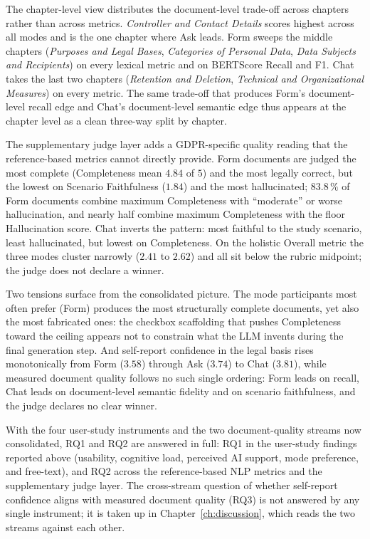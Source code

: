 The chapter-level view distributes the document-level trade-off
across chapters rather than across metrics. \emph{Controller and
Contact Details} scores highest across all modes and is the one
chapter where Ask leads. Form sweeps the middle chapters
(\emph{Purposes and Legal Bases}, \emph{Categories of Personal
Data}, \emph{Data Subjects and Recipients}) on every lexical
metric and on BERTScore Recall and F1. Chat takes the last two
chapters (\emph{Retention and Deletion}, \emph{Technical and
Organizational Measures}) on every metric. The same trade-off
that produces Form's document-level recall edge and Chat's
document-level semantic edge thus appears at the chapter level
as a clean three-way split by chapter.

The supplementary judge layer adds a GDPR-specific quality reading
that the reference-based metrics cannot directly provide. Form
documents are judged the most complete (Completeness mean $4.84$
of $5$) and the most legally correct, but the lowest on Scenario
Faithfulness ($1.84$) and the most hallucinated; $83.8\,\%$ of
Form documents combine maximum Completeness with ``moderate'' or
worse hallucination, and nearly half combine maximum Completeness
with the floor Hallucination score. Chat inverts the pattern:
most faithful to the study scenario, least hallucinated, but
lowest on Completeness. On the holistic Overall metric the three
modes cluster narrowly ($2.41$ to $2.62$) and all sit below the
rubric midpoint; the judge does not declare a winner.

Two tensions surface from the consolidated picture. The mode
participants most often prefer (Form) produces the most
structurally complete documents, yet also the most fabricated
ones: the checkbox scaffolding that pushes Completeness toward
the ceiling appears not to constrain what the LLM invents during
the final generation step. And self-report confidence in the
legal basis rises monotonically from Form ($3.58$) through Ask
($3.74$) to Chat ($3.81$), while measured document quality
follows no such single ordering: Form leads on recall, Chat leads
on document-level semantic fidelity and on scenario faithfulness,
and the judge declares no clear winner.

With the four user-study instruments and the two
document-quality streams now consolidated, RQ1 and RQ2 are
answered in full: RQ1 in the user-study findings reported above
(usability, cognitive load, perceived AI support, mode
preference, and free-text), and RQ2 across the reference-based
NLP metrics and the supplementary judge layer. The cross-stream
question of whether self-report confidence aligns with measured
document quality (RQ3) is not answered by any single instrument;
it is taken up in Chapter~\ref{ch:discussion}, which reads the
two streams against each other.
